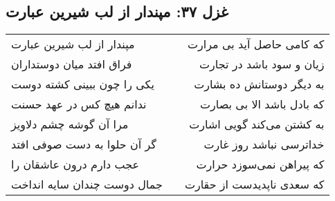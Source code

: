 \begin{center}
\section*{غزل ۳۷: مپندار از لب شیرین عبارت}
\label{sec:037}
\begin{longtable}{l p{0.5cm} r}
مپندار از لب شیرین عبارت
&&
که کامی حاصل آید بی مرارت
\\
فراق افتد میان دوستداران
&&
زیان و سود باشد در تجارت
\\
یکی را چون ببینی کشته دوست
&&
به دیگر دوستانش ده بشارت
\\
ندانم هیچ کس در عهد حسنت
&&
که بادل باشد الا بی بصارت
\\
مرا آن گوشه چشم دلاویز
&&
به کشتن می‌کند گویی اشارت
\\
گر آن حلوا به دست صوفی افتد
&&
خداترسی نباشد روز غارت
\\
عجب دارم درون عاشقان را
&&
که پیراهن نمی‌سوزد حرارت
\\
جمال دوست چندان سایه انداخت
&&
که سعدی ناپدیدست از حقارت
\\
\end{longtable}
\end{center}
